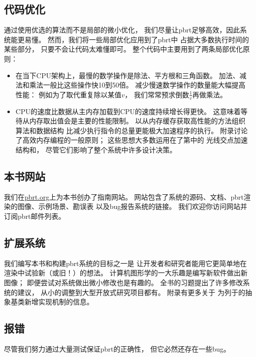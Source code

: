 \subsection{代码优化}\label{sub:代码优化}
通过使用优选的算法而不是局部的微小优化，
我们尽量让pbrt足够高效，因此系统能更易懂。
然而，我们将一些局部优化应用到了pbrt中
占据大多数执行时间的某些部分，
只要不会让代码太难懂即可。
整个代码中主要用到了两条局部优化原则：
\begin{itemize}
    \item 在当下CPU架构上，最慢的数学操作是除法、平方根和三角函数。
          加法、减法和乘法一般比这些操作快10到50倍。
          减少慢速数学操作的数量能大幅提高性能：
          例如为了取代重复除以某值$v$，
          我们常常预求倒数$\displaystyle\frac{1}{v}$再做乘法。
    \item CPU的速度比数据从主内存加载到CPU的速度持续增长得更快。
          这意味着等待从内存取出值会是主要的性能限制。
          以从内存缓存获取高性能的方法组织算法和数据结构
          比减少执行指令的总量更能极大加速程序的执行。
          附录讨论了高效内存编程的一般原则；
          这些思想大多数运用在了第中的
          光线交点加速结构和，
          尽管它们影响了整个系统中许多设计决策。
\end{itemize}

\subsection{本书网站}\label{sub:本书网站}
我们在\href{https://pbrt.org/}{\ttfamily pbrt.org}上为本书创办了指南网站。
网站包含了系统的源码、文档、pbrt渲染的图像、示例场景、勘误表
以及bug报告系统的链接。
我们欢迎你访问网站并订阅pbrt邮件列表。

\subsection{扩展系统}\label{sub:扩展系统}
我们编写本书和构建pbrt系统的目标之一是
让开发者和研究者能用它更简单地在渲染中试验新（或旧！）的想法。
计算机图形学的一大乐趣是编写新软件做出新图像；
即便尝试对系统做出微小修改也是有趣的。
全书的习题提出了许多修改系统的建议，
从小的调整到大型开放式研究项目都有。
附录有更多关于
为列于的抽象基类新增实现机制的信息。

\subsection{报错}\label{sub:报错}
尽管我们努力通过大量测试保证pbrt的正确性，
但它必然还存在一些bug。

